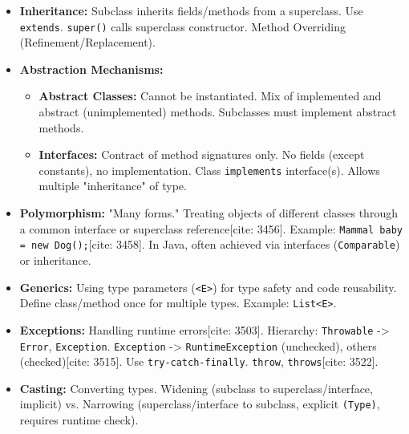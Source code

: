 \documentclass{article}
\begin{document}
\begin{itemize}
    \item \textbf{Inheritance:} Subclass inherits fields/methods from a superclass. Use \texttt{extends}. \texttt{super()} calls superclass constructor. Method Overriding (Refinement/Replacement).
    \item \textbf{Abstraction Mechanisms:}
          \begin{itemize}
              \item \textbf{Abstract Classes:} Cannot be instantiated. Mix of implemented and abstract (unimplemented) methods. Subclasses must implement abstract methods.
              \item \textbf{Interfaces:} Contract of method signatures only. No fields (except constants), no implementation. Class \texttt{implements} interface(s). Allows multiple "inheritance" of type.
          \end{itemize}
    \item \textbf{Polymorphism:} "Many forms." Treating objects of different classes through a common interface or superclass reference[cite: 3456]. Example: \texttt{Mammal baby = new Dog();}[cite: 3458]. In Java, often achieved via interfaces (\texttt{Comparable}) or inheritance.
    \item \textbf{Generics:} Using type parameters (\texttt{<E>}) for type safety and code reusability. Define class/method once for multiple types. Example: \texttt{List<E>}.
    \item \textbf{Exceptions:} Handling runtime errors[cite: 3503]. Hierarchy: \texttt{Throwable} -> \texttt{Error}, \texttt{Exception}. \texttt{Exception} -> \texttt{RuntimeException} (unchecked), others (checked)[cite: 3515]. Use \texttt{try-catch-finally}. \texttt{throw}, \texttt{throws}[cite: 3522].
    \item \textbf{Casting:} Converting types. Widening (subclass to superclass/interface, implicit) vs. Narrowing (superclass/interface to subclass, explicit \texttt{(Type)}, requires runtime check).
\end{itemize}
\end{document}
